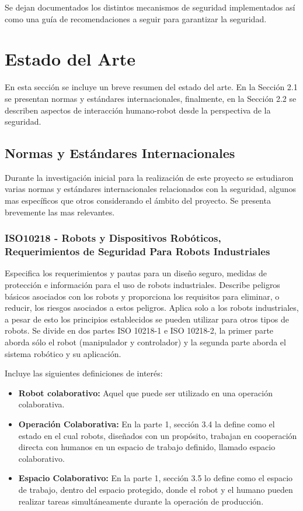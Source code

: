 \documentclass[withindex,glossary]{cam-thesis}
\begin{document}
Se dejan documentados los distintos mecanismos de seguridad implementados así como una guía de recomendaciones a seguir para garantizar la seguridad.

\chapter{Estado del Arte}
En esta sección se incluye un breve resumen del estado del arte. En la Sección 2.1 se presentan normas y estándares internacionales, finalmente, en la Sección 2.2 se describen aspectos de interacción humano-robot desde la perspectiva de la seguridad.

\section{Normas y Estándares Internacionales}
Durante la investigación inicial para la realización de este proyecto se estudiaron varias normas y estándares internacionales relacionados con la seguridad, algunos mas específicos que otros considerando el ámbito del proyecto. Se presenta brevemente las mas relevantes.

\subsection{ISO10218 - Robots y Dispositivos Robóticos, Requerimientos de Seguridad Para Robots Industriales} \label{sec: Marco Teorico :: Normas :: ISO 10218}
Especifica los requerimientos y pautas para un diseño seguro, medidas de protección e información para el uso de robots industriales. Describe peligros básicos asociados con los robots y proporciona los requisitos para eliminar, o reducir, los riesgos asociados a estos peligros. Aplica solo a los robots industriales, a pesar de esto los principios establecidos se pueden utilizar para otros tipos de robots. Se divide en dos partes ISO 10218-1 e ISO 10218-2, la primer parte aborda sólo el robot (manipulador y controlador) y la segunda parte aborda el sistema robótico y su aplicación.

Incluye las siguientes definiciones de interés:
\begin{itemize}[topsep=-11pt]
	\item \textbf{Robot colaborativo:} Aquel que puede ser utilizado en una operación colaborativa.
    \item \textbf{Operación Colaborativa:} En la parte 1, sección 3.4 la define como el estado en el cual robots, diseñados con un propósito, trabajan en cooperación directa con humanos en un espacio de trabajo definido, llamado espacio colaborativo.
    \item \textbf{Espacio Colaborativo:} En la parte 1, sección 3.5 lo define como el espacio de trabajo, dentro del espacio protegido, donde el robot y el humano pueden realizar tareas simultáneamente durante la operación de producción.
\\[-7pt]
\end{itemize}
\end{document}

